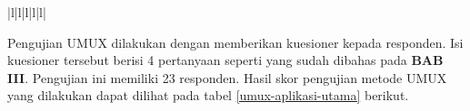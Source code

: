 \begin{table}[H]
\begin{tabular}{|l|l|l|l|l|}
		                                                                                                                                                                                                                                                                                                  \\ \hline
	\end{tabular}
\end{table}

\par Pengujian UMUX dilakukan dengan memberikan kuesioner kepada responden. Isi kuesioner tersebut berisi 4 pertanyaan seperti yang sudah dibahas pada \textbf{BAB III}. Pengujian ini memiliki 23 responden. Hasil skor pengujian metode UMUX yang dilakukan dapat dilihat pada tabel \ref{umux-aplikasi-utama} berikut.

